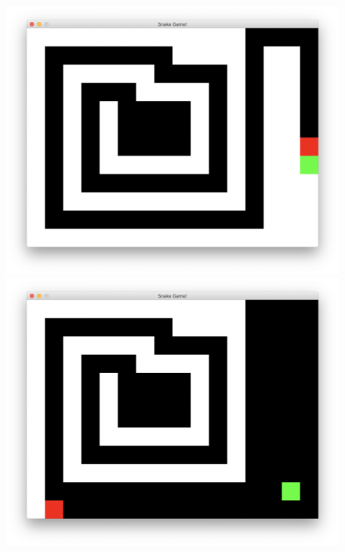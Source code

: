 \documentclass[a4paper]{article}
\begin{document}
\begin{figure}[!hbt]
\begin{minipage}{0.16\textwidth}
    \includegraphics[width=\linewidth]{assets/lp3.png}
\end{minipage}
\begin{minipage}{0.16\textwidth}
    \centering
    \includegraphics[width=\linewidth]{assets/lp4.png}
\end{minipage}
\begin{minipage}{0.16\textwidth}
    \centering

\end{minipage}
\end{figure}
\end{document}
